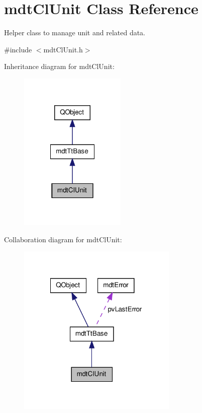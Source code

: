 \hypertarget{classmdt_cl_unit}{\section{mdt\-Cl\-Unit Class Reference}
\label{classmdt_cl_unit}
}


Helper class to manage unit and related data.  




{\ttfamily \#include $<$mdt\-Cl\-Unit.\-h$>$}



Inheritance diagram for mdt\-Cl\-Unit\-:\nopagebreak
\begin{figure}[H]
\begin{center}
\leavevmode
\includegraphics[width=144pt]{classmdt_cl_unit__inherit__graph}
\end{center}
\end{figure}


Collaboration diagram for mdt\-Cl\-Unit\-:\nopagebreak
\begin{figure}[H]
\begin{center}
\leavevmode
\includegraphics[width=216pt]{classmdt_cl_unit__coll__graph}
\end{center}
\end{figure}
